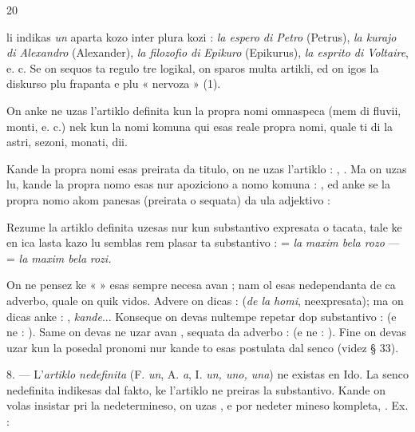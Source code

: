 \begin{VUpage}[24]{20}

\VUcontinue li indikas \textit{un} aparta kozo inter plura kozi : \textit{la espero di Petro}\nl
(Petrus), \textit{la kurajo di Alexandro} (Alexander), \textit{la filozofio di}\nl
\textit{Epikuro} (Epikurus), \textit{la esprito di Voltaire}, e. c. Se on sequos\nl
ta regulo tre logikal, on sparos multa artikli, ed on igos la\nl
diskurso plu frapanta e plu « nervoza » (1).

On anke ne uzas l'artiklo definita kun la propra nomi\nl
omnaspeca (mem di fluvii, monti, e. c.) nek kun la nomi\nl
komuna qui esas reale propra nomi, quale ti di la astri,\nl
sezoni, monati, dii.

Kande la propra nomi esas preirata da titulo, on ne uzas\nl
l'artiklo : , . Ma on uzas lu,\nl
kande la propra nomo esas nur apoziciono a nomo komuna :\nl
{}, ed anke se la propra nomo akom\cc
panesas (preirata o sequata) da ula adjektivo : \nl
{}

Rezume la artiklo definita uzesas nur kun substantivo\nl
expresata o tacata, tale ke en ica lasta kazo lu semblas rem\cc
plasar ta substantivo :  = \textit{la}\nl
\textit{maxim bela rozo} ---  = \textit{la maxim bela}\nl
\textit{rozi.}

On ne pensez ke «  » esas sempre necesa avan ;\nl
nam ol esas nedependanta de ca adverbo, quale on quik vidos.\nl
Advere on dicas :  (\textit{de la}\nl
\textit{homi}, neexpresata); ma on dicas anke : \nl
{}, \textit{kande}... Konseque on devas nultempe repetar\nl
{} dop substantivo :  (e ne : \nl
{}). Same on devas ne uzar  avan ,\nl
sequata da adverbo :  (e ne : \nl
{}). Fine on devas uzar  kun la posedal pronomi nur\nl
kande to esas postulata dal senco (videz § 33).

8. --- L'\textit{artiklo nedefinita} (F. \textit{un}, A. \textit{a}, I. \textit{un, uno, una})\nl
ne existas en Ido. La senco nedefinita indikesas dal fakto,\nl
ke l'artiklo  ne preiras la substantivo. Kande on volas\nl
insistar pri la nedetermineso, on uzas , e por nedeter\cc
mineso kompleta, . Ex. : \nl
{}\nl
{}
\end{VUpage}

